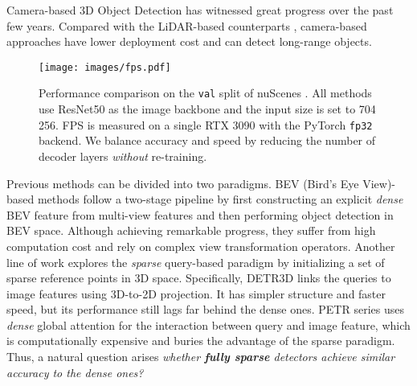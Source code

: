 \documentclass[10pt,twocolumn,letterpaper]{article}
\begin{document}
Camera-based 3D Object Detection \cite{bevdet, detr3d, petr, bevdet4d, bevdepth, bevformer, solofusion} has witnessed great progress over the past few years. Compared with the LiDAR-based counterparts \cite{pointpillars, centerpoint, largekernel3d, link}, camera-based approaches have lower deployment cost and can detect long-range objects.

\begin{figure}[t]
\texttt{[image: images/fps.pdf]}
  \vspace{-5pt}
  \caption{Performance comparison on the \texttt{val} split of nuScenes \cite{nuscenes}. All methods use ResNet50 \cite{resnet} as the image backbone and the input size is set to 704  256. FPS is measured on a single RTX 3090 with the PyTorch \texttt{fp32} backend. We balance accuracy and speed by reducing the number of decoder layers \textit{without} re-training.}
  \vspace{-10pt}
  \label{fig:intro}
\end{figure}

Previous methods can be divided into two paradigms. BEV (Bird's Eye View)-based methods \cite{bevdet, bevdet4d, bevformer, bevdepth, solofusion} follow a two-stage pipeline by first constructing an explicit \textit{dense} BEV feature from multi-view features and then performing object detection in BEV space. Although achieving remarkable progress, they suffer from high computation cost and rely on complex view transformation operators.
Another line of work \cite{detr3d, petr, petrv2} explores the \textit{sparse} query-based paradigm by initializing a set of sparse reference points in 3D space. Specifically, DETR3D \cite{detr3d} links the queries to image features using 3D-to-2D projection. It has simpler structure and faster speed, but its performance still lags far behind the dense ones. PETR series \cite{petr, petrv2} uses \textit{dense} global attention for the interaction between query and image feature, which is computationally expensive and buries the advantage of the sparse paradigm.
Thus, a natural question arises {\em whether {\bf fully sparse} detectors achieve similar accuracy to the dense ones?}
\end{document}
